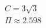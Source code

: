 \documentclass[preview]{standalone}
\begin{document}
\begin{align*}
C = 3\sqrt{3} \\\Pi \approx 2.598
\end{align*}
\end{document}
